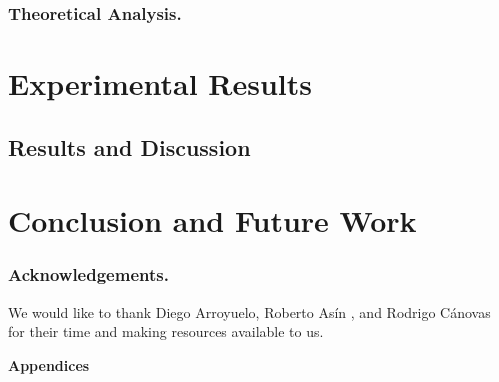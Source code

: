 \documentclass[runningheads]{llncs}
\begin{document}
\subsubsection{Theoretical Analysis.}
\label{subsec:theoreticalAnalysis}


%


\section{Experimental Results}
\label{sec:exps}



\subsection{Results and Discussion}
\label{subsec:resultsDiscussion}



\section{Conclusion and Future Work}
\label{sec:conclusion}


\vspace{-10pt}
\subsubsection*{Acknowledgements.}
We would like to thank Diego Arroyuelo, Roberto As\'{i}n , and Rodrigo
C\'{a}novas for their time and making resources available to us.

\vspace{-10pt}



\newpage
\appendix
\begin{center}
  \bf \Large Appendices
\end{center}



\end{document}
